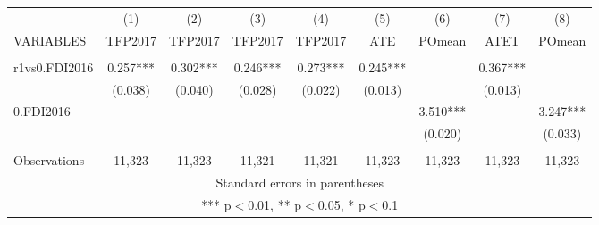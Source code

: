 \documentclass[]{article}
\begin{document}
\begin{tabular}{lcccccccc} \hline
 & (1) & (2) & (3) & (4) & (5) & (6) & (7) & (8) \\
VARIABLES & TFP2017 & TFP2017 & TFP2017 & TFP2017 & ATE & POmean & ATET & POmean \\ \hline
 &  &  &  &  &  &  &  &  \\
r1vs0.FDI2016 & 0.257*** & 0.302*** & 0.246*** & 0.273*** & 0.245*** &  & 0.367*** &  \\
 & (0.038) & (0.040) & (0.028) & (0.022) & (0.013) &  & (0.013) &  \\
0.FDI2016 &  &  &  &  &  & 3.510*** &  & 3.247*** \\
 &  &  &  &  &  & (0.020) &  & (0.033) \\
 &  &  &  &  &  &  &  &  \\
 Observations & 11,323 & 11,323 & 11,321 & 11,321 & 11,323 & 11,323 & 11,323 & 11,323 \\ \hline
\multicolumn{9}{c}{ Standard errors in parentheses} \\
\multicolumn{9}{c}{ *** p$<$0.01, ** p$<$0.05, * p$<$0.1} \\
\end{tabular}
\end{document}
